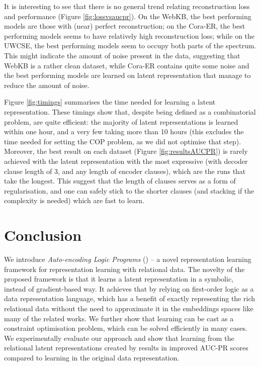 It is interesting to see that there is no general trend relating reconstruction loss and performance (Figure \ref{fig:lossvsaucpr}).
On the WebKB, the best performing models are those with (near) perfect reconstruction; on the Cora-ER, the best performing models seems to have relatively high reconstruction loss; while on the UWCSE, the best performing models seem to occupy both parts of the spectrum.
This might indicate the amount of noise present in the data, suggesting that WebKB is a rather clean dataset, while Cora-ER contains quite some noise and the best performing models are learned on latent representation that manage to reduce the amount of noise.


Figure \ref{fig:timings} summarises the time needed for learning a  latent representation.
These timings show that, despite being defined as a combinatorial problem,  are quite efficient: the majority of latent representations is learned within one hour, and a very few taking more than 10 hours (this excludes the time needed for setting the COP problem, as we did not optimise that step).
Moreover, the best result on each dataset (Figure \ref{fig:resultsAUCPR}) is rarely achieved with the latent representation with the most expressive \alp{} (with decoder clause length of 3, and any length of encoder clauses), which are the runs that take the longest.
This suggest that the length of clauses serves as a form of regularisation, and one can safely stick to the shorter clauses (and stacking if the complexity is needed) which are fast to learn.









\section{Conclusion}


We introduce \textit{Auto-encoding Logic Programs} () -- a novel representation learning framework for representation learning with relational data.
The novelty of the proposed framework is that it learns a latent representation in a symbolic, instead of gradient-based way.
It achieves that by relying on first-order logic as a data representation language, which has a benefit of exactly representing the rich relational data without the need to approximate it in the embeddings spaces like many of the related works.
We further show that learning  can be cast as a constraint optimisation problem, which can be solved efficiently in many cases.
We experimentally evaluate our approach and show that learning from the relational latent representations created by  results in improved AUC-PR scores compared to learning in the original data representation.


\cleardoublepage

